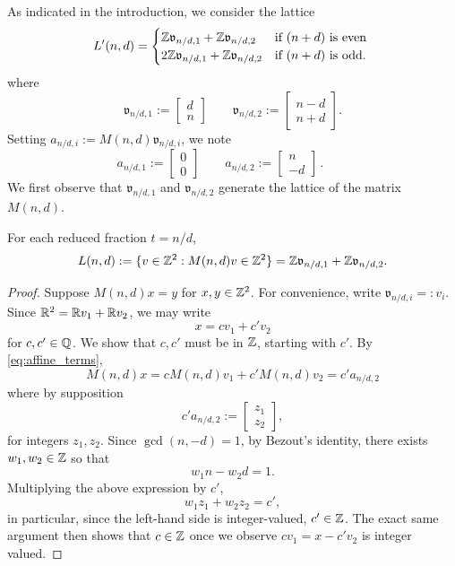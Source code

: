 \documentclass[12pt]{amsart}
\begin{document}
As indicated in the introduction, we consider the lattice 
\begin{equation} \label{eq:modified_lattice}
L'(n,d) = 
\begin{cases}
\mathbb{Z} \mathfrak{v}_{n/d,1} + \mathbb{Z} \mathfrak{v}_{n/d,2} &\mbox{if $(n+d)$ is even } \\
2 \mathbb{Z} \mathfrak{v}_{n/d,1} + \mathbb{Z} \mathfrak{v}_{n/d,2}  &\mbox{if $(n+d)$ is odd}.
\end{cases}
\end{equation}
where
\begin{equation} \label{eq:translation_terms}
\mathfrak{v}_{n/d, 1} := \begin{bmatrix} d  \\ n \end{bmatrix}
\qquad
\mathfrak{v}_{n/d,2}  := \begin{bmatrix} n -d \\ n + d \end{bmatrix}.
\end{equation}
Setting $a_{n/d,i} := M(n,d) \mathfrak{v}_{n/d,i}$, we note
\begin{equation} \label{eq:affine_terms}
a_{n/d,1} :=  \begin{bmatrix} 0  \\ 0 \end{bmatrix}
\qquad
a_{n/d,2} := \begin{bmatrix} n \\ -d \end{bmatrix} \, . 
\qquad
\end{equation}
We first observe that $\mathfrak{v}_{n/d,1}$ and $\mathfrak{v}_{n/d,2}$ generate the lattice of the matrix $M(n,d)$. 
\begin{lemma}
	For each reduced fraction $t = n/d$,  
	\[
	L(n,d) := \{ v \in \mathbb{Z}^2 :  M(n,d) v \in \mathbb{Z}^2 \} = \mathbb{Z}  \mathfrak{v}_{n/d,1} + \mathbb{Z} \mathfrak{v}_{n/d,2}.
	\]
\end{lemma}
\begin{proof}
	Suppose $M(n,d) x = y$ for $x, y \in \mathbb{Z}^2$.  For convenience, write $\mathfrak{v}_{n/d, i} =: v_i$. Since $\mathbb{R}^2 = \mathbb{R} v_1 + \mathbb{R} v_2$, we may write 
	\[
	x = c v_1 + c' v_2
	\]
	for $c,c' \in \mathbb{Q}$. We show that $c,c'$ must be in $\mathbb{Z}$, starting with $c'$. By \eqref{eq:affine_terms}, 
	\[
	M(n,d) x = c M(n,d) v_1 + c' M(n,d) v_2 = c' a_{n/d,2}
	\]
	where by supposition
	\[
	c' a_{n/d,2} := \begin{bmatrix} z_1 \\ z_2 \end{bmatrix},
	\]
	for integers $z_1,z_2$. Since $\gcd(n,-d) = 1$, by Bezout's identity, there exists $w_1, w_2 \in \mathbb{Z}$ so that
	\[
	w_1 n - w_2 d = 1.
	\]
	Multiplying the above expression by $c'$, 
	\[
	w_1 z_1 + w_2 z_2 = c',
	\]
	in particular, since the left-hand side is integer-valued, $c' \in \mathbb{Z}$. The exact same argument
	then shows that $c \in \mathbb{Z}$ once we observe $c v_1 = x - c' v_2$ is integer valued. 
\end{proof}
\end{document}
